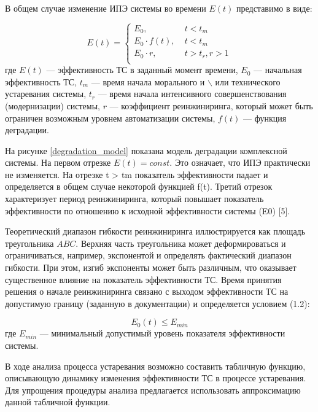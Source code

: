 В общем случае изменение ИПЭ системы во времени $E(t)$ представимо в виде:

\begin{equation} \label{eq:oldModel}
    E(t) = \begin{cases}
        E_0,            & \; t<t_m         \\
        E_0 \cdot f(t), & \; t<t_m         \\
        E_0 \cdot r,          & \; t>t_r, r>1 \\
    \end{cases}
\end{equation}
где $E(t)$ --- эффективность ТС в заданный момент времени,
$E_0$ --- начальная эффективность ТС, 
$t_m$ --- время начала морального и $\backslash$ или технического устаревания системы,
$t_r$ --- время начала интенсивного совершенствования (модернизации) системы,
$r$ --- коэффициент реинжиниринга, который может быть ограничен возможным уровнем автоматизации системы,
$f(t)$ --- функция деградации.

На рисунке \ref{degradation_model} показана модель деградации комплексной системы. 
На первом отрезке $E(t) = const$. 
Это означает, что ИПЭ практически не изменяется. 
На отрезке t > tm показатель эффективности падает и определяется в общем случае некоторой функцией f(t). 
Третий отрезок характеризует период реинжиниринга, который повышает показатель эффективности по отношению к исходной эффективности системы (E0) [5].


Теоретический диапазон гибкости реинжиниринга иллюстрируется как площадь треугольника $ABC$. 
Верхняя часть треугольника может деформироваться и ограничиваться, например, экспонентой и определять фактический диапазон гибкости. 
При этом, изгиб экспоненты может быть различным, что оказывает существенное влияние на показатель эффективности ТС. 
Время принятия решения о начале реинжиниринга связано с выходом эффективности ТС на допустимую границу (заданную в документации) и определяется условием (1.2):

\begin{equation} \label{eq:oldModel}
    E_0(t) \leq E_{min}
\end{equation}
где	$E_{min}$ --- минимальный допустимый уровень показателя эффективности системы.

В ходе анализа процесса устаревания возможно составить табличную функцию, описывающую динамику изменения эффективности ТС в процессе устаревания. 
Для упрощения процедуры анализа предлагается использовать аппроксимацию данной табличной функции.
 
